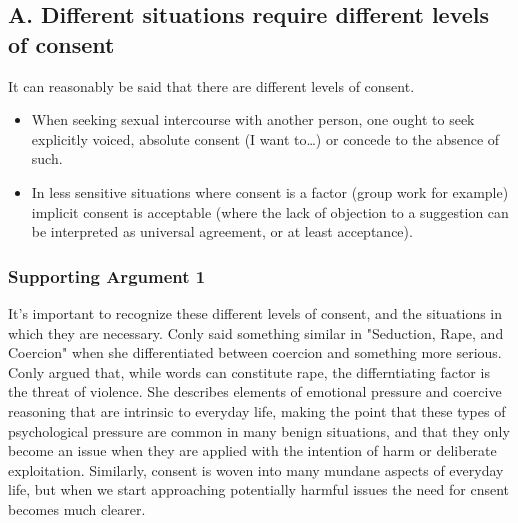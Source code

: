 \documentclass[11pt]{article}
\begin{document}
\subsection{A. Different situations require different levels of consent}
\label{sec:orgb6a0073}
It can reasonably be said that there are different levels of consent.
\begin{itemize}
\item When seeking sexual intercourse with another person, one ought to seek explicitly voiced, absolute consent (I want to\ldots{}) or concede to the absence of such.
\item In less sensitive situations where consent is a factor (group work for example) implicit consent is acceptable (where the lack of objection to a suggestion can be interpreted as universal agreement, or at least acceptance).
\end{itemize}


\subsubsection{Supporting Argument 1}
\label{sec:org395e7a2}
It's important to recognize these different levels of consent, and the situations in which they are necessary. Conly said something similar in "Seduction, Rape, and Coercion" when she differentiated between coercion and something more serious. Conly argued that, while words can constitute rape, the differntiating factor is the threat of violence. She describes elements of emotional pressure and coercive reasoning that are intrinsic to everyday life, making the point that these types of psychological pressure are common in many benign situations, and that they only become an issue when they are applied with the intention of harm or deliberate exploitation. Similarly, consent is woven into many mundane aspects of everyday life, but when we start approaching potentially harmful issues the need for cnsent becomes much clearer.
\end{document}
